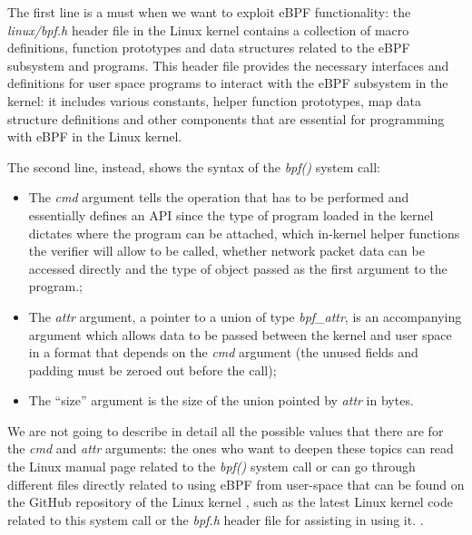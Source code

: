 The first line is a must when we want to exploit eBPF functionality: the \textit{linux/bpf.h} header file in the Linux kernel contains a collection of macro definitions, function prototypes and data structures related to the eBPF subsystem and programs. 
This header file provides the necessary interfaces and definitions for user space programs to interact with the eBPF subsystem in the kernel: it includes various constants, helper function prototypes, map data structure definitions and other components that are essential for programming with eBPF in the Linux kernel.

The second line, instead, shows the syntax of the \textit{bpf()} system call:

\begin{itemize}
	\item The \textit{cmd} argument tells the operation that has to be performed and 
		essentially defines an API since the type of program loaded in the kernel dictates where the program can be attached, which in-kernel helper functions the verifier will allow to be called, whether network packet data can be accessed directly and the type of object passed as the first argument to the program.;
	\item The \textit{attr} argument, a pointer to a union of type \textit{bpf\_attr},
		is an accompanying argument which allows data to be passed between the kernel and user space in a format that depends on the \textit{cmd} argument (the unused fields and padding must be zeroed out before the call);
	\item The ``size'' argument is the size of the union pointed by \textit{attr} 
		in bytes.
\end{itemize}

We are not going to describe in detail all the possible values that there are for the \textit{cmd} and \textit{attr} arguments: the ones who want to deepen these topics can read the Linux manual page related to the \textit{bpf()} system call \cite{BPFManPage} or can go through different files directly related to using eBPF from user-space that can be found on the GitHub repository of the Linux kernel \cite{LinuxKernelRepo}, such as the latest Linux kernel code related to this system call \cite{BPFKernelCode} or the \textit{bpf.h} header file \cite{BPFHeader} for assisting in using it.	.

